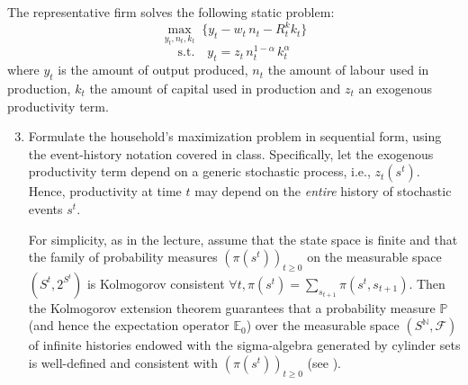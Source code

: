 \documentclass[dvipsnames,11pt]{article}
\begin{document}
        \medskip

        The representative firm solves the following static problem:
        \[
        \max_{y_t, n_t, k_t } \;\{y_t - w_t\,n_t  - R_t^k k_t   \}
        \]
        \[ 
        \mathrm{s.t.}\quad y_t = z_t\,n_t^{1-\alpha}\,k_t^{\alpha} 
        \]
        where $y_t$ is the amount of output produced, $n_t$ the amount of labour used in production, $k_t$ the amount of capital used in production and $z_t$ an exogenous productivity term.

        \begin{enumerate}
        \setcounter{enumi}{2}
            \item Formulate the household’s maximization problem in sequential form, using the event-history notation covered in class. Specifically,  let the exogenous productivity term depend on a generic stochastic process, i.e., $z_t(s^t)$. Hence, productivity at time $t$ may depend on the \textit{entire} history of stochastic events $s^t$.  

            \begin{solution}
            
For simplicity, as in the lecture, assume that the state space is finite and that the family of probability measures $(\pi(s^t))_{t\ge0}$ on the measurable space $(S^t,2^{S^t})$ is Kolmogorov consistent $\forall t, \pi(s^t) = \sum_{s_{t+1}}\pi(s^t,s_{t+1})$. Then the Kolmogorov extension theorem guarantees that a probability measure $\mathbb{P}$ (and hence the expectation operator $\mathbb{E}_0$) over the measurable space $(S^\mathbb{N},\mathcal{F})$ of infinite histories endowed with the sigma-algebra generated by cylinder sets is well-defined and consistent with $(\pi(s^t))_{t\ge0}$ (see \cite{billingsley1986probability}).  


\end{solution}
\end{enumerate}
\end{document}
